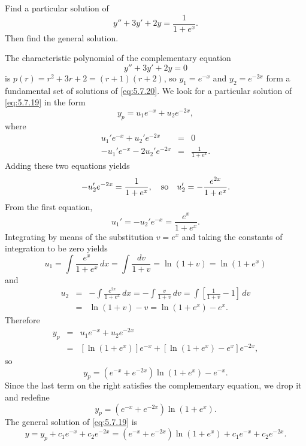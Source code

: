 \documentclass{ximera}
\begin{document}
\begin{example}\label{example:5.7.3}
 Find a particular solution of
\begin{equation}  \label{eq:5.7.19}
y''+3y'+2y=\frac{1}{1+e^x}.
\end{equation}
Then find the general solution.


\begin{explanation}

The characteristic polynomial of the complementary equation
\begin{equation} \label{eq:5.7.20}
y''+3y'+2y=0
\end{equation}
is $p(r)=r^2+3r+2=(r+1)(r+2)$, so
$y_1=e^{-x}$ and $y_2=e^{-2x}$ form a fundamental set of solutions of
\eqref{eq:5.7.20}.  We look for a particular solution of
\eqref{eq:5.7.19} in the form
$$
y_p=u_1e^{-x}+u_2e^{-2x},
$$
where
\begin{eqnarray*}
u_1'e^{-x}+u_2'e^{-2x}&=&0\\
-u_1'e^{-x}-2u_2'e^{-2x}&=&\frac{1}{1+e^x}.
\end{eqnarray*}
Adding these two equations yields
$$
-u_2'e^{-2x}=\frac{1}{1+e^x},\quad\mbox{so}\quad
u_2'=-{e^{2x}\over 1+e^x}.
 $$
From the first equation,
$$
u_1'=-u_2'e^{-x}=\frac{e^x}{1+e^x}.
$$
Integrating by means of  the substitution $v=e^x$ and taking the
constants of integration to be zero  yields
 $$
u_1=\int\frac{e^x}{1+e^x}\,dx=\int \frac{dv}{1+v}
=\ln(1+v)=\ln(1+e^x)
$$
and
\begin{eqnarray*}
u_2&=&-\int\frac{e^{2x}}{1+e^x}\,dx=-\int \frac{v}{1+v}\,dv
=\int\left[\frac{1}{1+v}-1\right]\,dv \\
&=&\ln(1+v)-v=\ln(1+e^x)-e^x.
\end{eqnarray*}
Therefore
\begin{eqnarray*}
y_p&=&u_1e^{-x}+u_2e^{-2x}\\
&=&[\ln(1+e^x)]e^{-x}+\left[\ln(1+e^x)-e^x\right]e^{-2x},
\end{eqnarray*}
so
$$
y_p=\left(e^{-x}+e^{-2x}\right)\ln(1+e^x)-e^{-x}.
$$
Since the last term on the right satisfies  the complementary
equation, we drop it and redefine
$$
y_p=\left(e^{-x}+e^{-2x}\right)\ln(1+e^x).
$$
The general solution of
 \eqref{eq:5.7.19} is
$$
y=y_p+c_1e^{-x}+c_2e^{-2x}=\left(e^{-x}+e^{-2x}\right)\ln(1+e^x)
+c_1e^{-x}+c_2e^{-2x}.
$$
\end{explanation}
\end{example}
\end{document}
